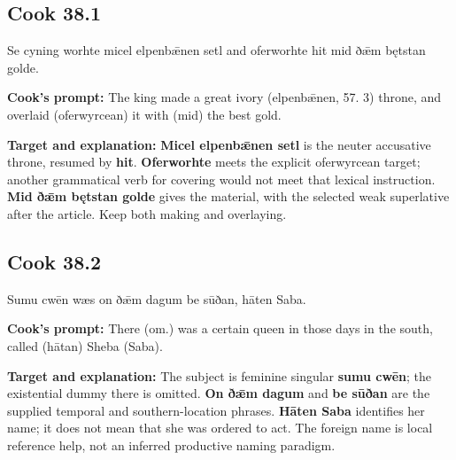 \par\begin{minipage}{\linewidth}\raggedright
\subsection*{Cook 38.1}

Se cyning worhte micel elpenbǣnen setl and oferworhte hit mid ðǣm bętstan golde.

\textbf{Cook's prompt:} The king made a great ivory (elpenbǣnen, 57. 3) throne, and overlaid (oferwyrcean) it with (mid) the best gold.

\textbf{Target and explanation:} \textbf{Micel elpenbǣnen setl} is the neuter accusative throne, resumed by \textbf{hit}. \textbf{Oferworhte} meets the explicit oferwyrcean target; another grammatical verb for covering would not meet that lexical instruction. \textbf{Mid ðǣm bętstan golde} gives the material, with the selected weak superlative after the article. Keep both making and overlaying.

\end{minipage}\par\addvspace{4pt}

\par\begin{minipage}{\linewidth}\raggedright
\subsection*{Cook 38.2}

Sumu cwēn wæs on ðǣm dagum be sūðan, hāten Saba.

\textbf{Cook's prompt:} There (om.) was a certain queen in those days in the south, called (hātan) Sheba (Saba).

\textbf{Target and explanation:} The subject is feminine singular \textbf{sumu cwēn}; the existential dummy there is omitted. \textbf{On ðǣm dagum} and \textbf{be sūðan} are the supplied temporal and southern-location phrases. \textbf{Hāten Saba} identifies her name; it does not mean that she was ordered to act. The foreign name is local reference help, not an inferred productive naming paradigm.

\end{minipage}\par\addvspace{4pt}

